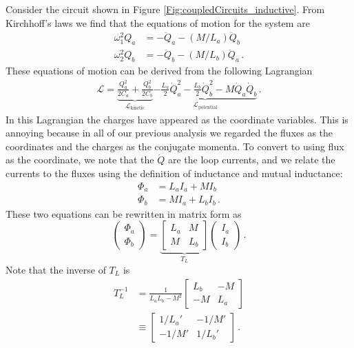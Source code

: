 Consider the circuit shown in Figure \ref{Fig:coupledCircuits_inductive}.
From Kirchhoff's laws we find that the equations of motion for the system are
\begin{align*}
  \omega_1^2 Q_a &= -\ddot{Q}_a - \left(M/L_a\right) \ddot{Q}_b \\
  \omega_2^2 Q_b &= -\ddot{Q}_b - \left(M/L_b\right) \ddot{Q}_a
  \, .
\end{align*}
These equations of motion can be derived from the following Lagrangian
\begin{align*}
  \mathcal{L} =
  \underbrace{
      \frac{Q_a^2}{2 C_a} + \frac{Q_b^2}{2 C_b}
  }_{\mathcal{L}_\text{kinetic}}
  \underbrace{
    - \frac{L_a}{2}\dot{Q}_a^2
    - \frac{L_b}{2}\dot{Q}_b^2
    - M \dot{Q}_a \dot{Q}_b
  }_{\mathcal{L}_\text{potential}}
  \, . \label{eq:sec.coupling.subsec.inductiveCoupling:Lagrangian}
\end{align*}
In this Lagrangian the charges have appeared as the coordinate variables.
This is annoying because in all of our previous analysis we regarded the fluxes as the coordinates and the charges as the conjugate momenta.
To convert to using flux as the coordinate, we note that the $\dot{Q}$ are the loop currents, and we relate the currents to the fluxes using the definition of inductance and mutual inductance:
\begin{align*}
  \Phi_a &= L_a I_a + M I_b \\
  \Phi_b &= M I_a + L_b I_b \, .
\end{align*}
These two equations can be rewritten in matrix form as
\begin{equation*}
  \left( \begin{array}{c} \Phi_a \\ \Phi_b \end{array} \right)
  =
  \underbrace{
    \left[ \begin{array}{cc} L_a & M \\ M & L_b \end{array} \right]
  }_{T_L}
  \left( \begin{array}{c} I_a \\ I_b \end{array} \right) \, . \label{eq:sec.coupling.subsec.inductiveCoupling:fluxToI}
\end{equation*}
Note that the inverse of $T_L$ is
\begin{align*}
  T_L^{-1}
  &= \frac{1}{L_a L_b - M^2}
  \left[ \begin{array}{cc}
    L_b & -M \\ -M & L_a
  \end{array} \right] \nonumber \\
  &\equiv \left[ \begin{array}{cc}
    1/L_a' & -1/M' \\ -1/M' & 1/L_b'
  \end{array} \right]
  \, .
\end{align*}
